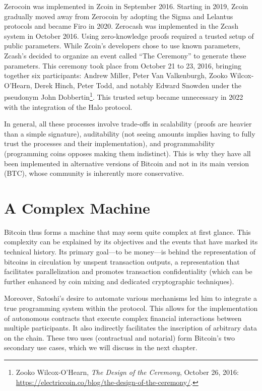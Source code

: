 \documentclass[
  a5paper,
  smalldemyvopaper,10pt,twoside,onecolumn,openright,extrafontsizes,hidelinks]{memoir}
\begin{document}
Zerocoin was implemented in Zcoin in September 2016. Starting in 2019,
Zcoin gradually moved away from Zerocoin by adopting the Sigma and
Lelantus protocols and became Firo in 2020. Zerocash was implemented in
the Zcash system in October 2016. Using zero-knowledge proofs required a
trusted setup of public parameters. While Zcoin's developers chose to
use known parameters, Zcash's decided to organize an event called ``The
Ceremony'' to generate these parameters. This ceremony took place from
October 21 to 23, 2016, bringing together six participants: Andrew
Miller, Peter Van Valkenburgh, Zooko Wilcox-O'Hearn, Derek Hinch, Peter
Todd, and notably Edward Snowden under the pseudonym John
Dobbertin\footnote{Zooko Wilcox-O'Hearn, \emph{The Design of the
  Ceremony}, October 26, 2016:
  \url{https://electriccoin.co/blog/the-design-of-the-ceremony/}.}. This
trusted setup became unnecessary in 2022 with the integration of the
Halo protocol.

In general, all these processes involve trade-offs in scalability
(proofs are heavier than a simple signature), auditability (not seeing
amounts implies having to fully trust the processes and their
implementation), and programmability (programming coins opposes making
them indistinct). This is why they have all been implemented in
alternative versions of Bitcoin and not in its main version (BTC), whose
community is inherently more conservative.

\section*{A Complex Machine}\label{a-complex-machine}


Bitcoin thus forms a machine that may seem quite complex at first
glance. This complexity can be explained by its objectives and the
events that have marked its technical history. Its primary goal---to be
money---is behind the representation of bitcoins in circulation by
unspent transaction outputs, a representation that facilitates
parallelization and promotes transaction confidentiality (which can be
further enhanced by coin mixing and dedicated cryptographic techniques).

Moreover, Satoshi's desire to automate various mechanisms led him to
integrate a true programming system within the protocol. This allows for
the implementation of autonomous contracts that execute complex
financial interactions between multiple participants. It also indirectly
facilitates the inscription of arbitrary data on the chain. These two
uses (contractual and notarial) form Bitcoin's two secondary use cases,
which we will discuss in the next chapter.
\end{document}
